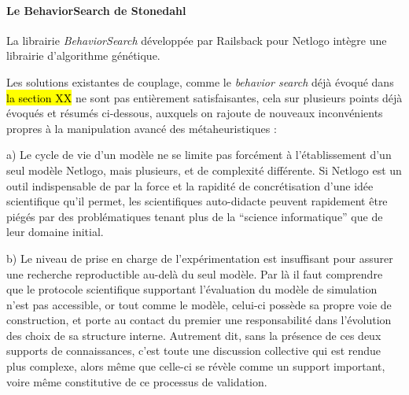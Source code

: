 \paragraph{Le {BehaviorSearch} de Stonedahl}

La librairie \textit{BehaviorSearch} développée par Railsback pour Netlogo intègre une librairie d'algorithme génétique.

Les solutions existantes de couplage, comme le \textit{behavior search} déjà évoqué dans \hl{la section XX} ne sont pas entièrement satisfaisantes, cela sur plusieurs points déjà évoqués et résumés ci-dessous, auxquels on rajoute de nouveaux inconvénients propres à la manipulation avancé des métaheuristiques :

a) Le cycle de vie d'un modèle ne se limite pas forcément à l'établissement d'un seul modèle Netlogo, mais plusieurs, et de complexité différente. Si Netlogo est un outil indispensable de par la force et la rapidité de concrétisation d'une idée scientifique qu'il permet, les scientifiques auto-didacte peuvent rapidement être piégés par des problématiques tenant plus de la \enquote{science informatique} que de leur domaine initial.

b) Le niveau de prise en charge de l'expérimentation est insuffisant pour assurer une recherche reproductible au-delà du seul modèle. Par là il faut comprendre que le protocole scientifique supportant l'évaluation du modèle de simulation n'est pas accessible, or tout comme le modèle, celui-ci possède sa propre voie de construction, et porte au contact du premier une responsabilité dans l'évolution des choix de sa structure interne. Autrement dit, sans la présence de ces deux supports de connaissances, c'est toute une discussion collective qui est rendue plus complexe, alors même que celle-ci se révèle comme un support important, voire même constitutive de ce processus de validation.

